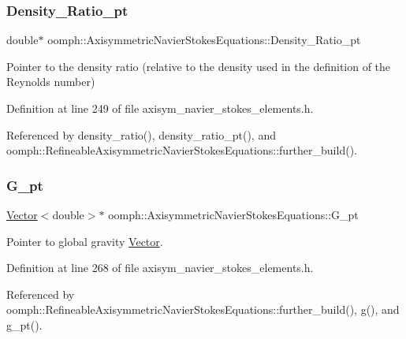 \subsubsection{\texorpdfstring{Density\+\_\+\+Ratio\+\_\+pt}{Density\_Ratio\_pt}}
{\footnotesize\ttfamily double$\ast$ oomph\+::\+Axisymmetric\+Navier\+Stokes\+Equations\+::\+Density\+\_\+\+Ratio\+\_\+pt\hspace{0.3cm}{\ttfamily [protected]}}



Pointer to the density ratio (relative to the density used in the definition of the Reynolds number) 



Definition at line 249 of file axisym\+\_\+navier\+\_\+stokes\+\_\+elements.\+h.



Referenced by density\+\_\+ratio(), density\+\_\+ratio\+\_\+pt(), and oomph\+::\+Refineable\+Axisymmetric\+Navier\+Stokes\+Equations\+::further\+\_\+build().

\mbox{\label{classoomph_1_1AxisymmetricNavierStokesEquations_a1a2ff96126d9077ab3da76ee81149b78}} 
\subsubsection{\texorpdfstring{G\+\_\+pt}{G\_pt}}
{\footnotesize\ttfamily \hyperlink{classoomph_1_1Vector}{Vector}$<$double$>$$\ast$ oomph\+::\+Axisymmetric\+Navier\+Stokes\+Equations\+::\+G\+\_\+pt\hspace{0.3cm}{\ttfamily [protected]}}



Pointer to global gravity \hyperlink{classoomph_1_1Vector}{Vector}. 



Definition at line 268 of file axisym\+\_\+navier\+\_\+stokes\+\_\+elements.\+h.



Referenced by oomph\+::\+Refineable\+Axisymmetric\+Navier\+Stokes\+Equations\+::further\+\_\+build(), g(), and g\+\_\+pt().

\mbox{\label{classoomph_1_1AxisymmetricNavierStokesEquations_aff943b6b83128398a0320cae90c6b94c}} 
